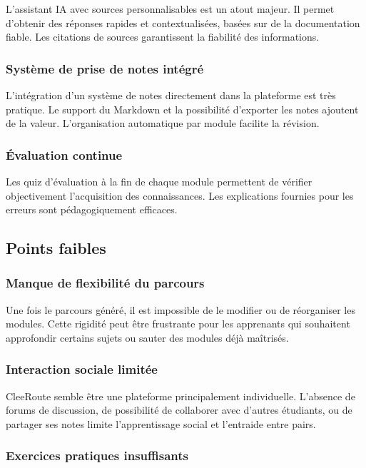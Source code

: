 \documentclass[12pt,a4paper]{article}
\begin{document}
L'assistant IA avec sources personnalisables est un atout majeur. Il permet d'obtenir des réponses rapides et contextualisées, basées sur de la documentation fiable. Les citations de sources garantissent la fiabilité des informations.

\subsubsection{Système de prise de notes intégré}

L'intégration d'un système de notes directement dans la plateforme est très pratique. Le support du Markdown et la possibilité d'exporter les notes ajoutent de la valeur. L'organisation automatique par module facilite la révision.

\subsubsection{Évaluation continue}

Les quiz d'évaluation à la fin de chaque module permettent de vérifier objectivement l'acquisition des connaissances. Les explications fournies pour les erreurs sont pédagogiquement efficaces.

\subsection{Points faibles}

\subsubsection{Manque de flexibilité du parcours}

Une fois le parcours généré, il est impossible de le modifier ou de réorganiser les modules. Cette rigidité peut être frustrante pour les apprenants qui souhaitent approfondir certains sujets ou sauter des modules déjà maîtrisés.

\subsubsection{Interaction sociale limitée}

CleeRoute semble être une plateforme principalement individuelle. L'absence de forums de discussion, de possibilité de collaborer avec d'autres étudiants, ou de partager ses notes limite l'apprentissage social et l'entraide entre pairs.

\subsubsection{Exercices pratiques insuffisants}
\end{document}
